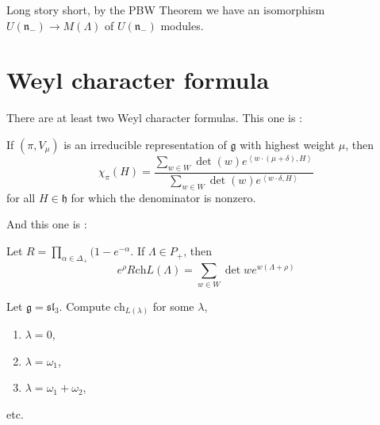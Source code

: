 Long story short, by the PBW Theorem we
have an isomorphism $U(\mathfrak{n}_-) \to M(\Lambda)$
of $U(\mathfrak{n}_-)$ modules.

\section{Weyl character formula}
\label{section-Weyl-character-formula}

There are at least two Weyl character formulas.
This one is \cite[Theorem 10.14]{Hall}:

\begin{theorem}
\label{theorem-Weyl-character-formula-Hall}
If $(\pi,V_\mu)$ is an irreducible representation of
$\mathfrak{g}$ with highest weight $\mu$, then
\begin{equation}
\label{equation-Weyl-character-formula-Hall}
\chi_\pi(H)=\frac{\sum_{w \in W}\det(w)e^{\left<w\cdot(\mu+\delta),H\right>}}
{\sum_{w \in W}\det(w)e^{\left<w\cdot \delta,H\right>}}
\end{equation}
for all $H \in \mathfrak{h}$ for which the denominator is nonzero.
\end{theorem}

And this one is \cite[Theorem 25.3]{KLAL}:

\begin{theorem}
\label{theorem-Weyl-character-formula-KLAL}
Let $R=\prod_{\alpha \in \Delta_+}(1-e^{-\alpha}$.
If  $\Lambda \in P_+$, then
\begin{equation}
\label{equation-Weyl-character-formula-KLAL}
e^{\rho}R \text{ch}L(\Lambda)=\sum_{w \in W}\det w e^{w(\Lambda+\rho)}
\end{equation}
\end{theorem}

\begin{exercise}
\label{exercise-Weyl-character-formula-in-sl3}
Let $\mathfrak{g}=\mathfrak{sl}_3$. Compute $\text{ch}_{L(\lambda)}$
for some $\lambda$,
\begin{enumerate}
\item $\lambda=0$,
\item $\lambda=\omega_1$,
\item $\lambda=\omega_1+\omega_2$,
\end{enumerate}
etc.
\end{exercise}

